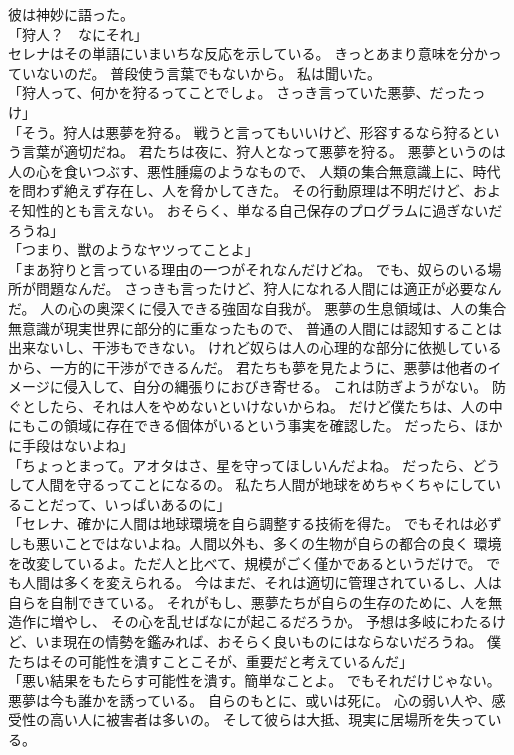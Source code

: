 \documentclass[../IHMain]{subfiles}
\begin{document}
彼は神妙に語った。\\
「狩人？　なにそれ」\\
セレナはその単語にいまいちな反応を示している。
きっとあまり意味を分かっていないのだ。
普段使う言葉でもないから。
私は聞いた。\\
「狩人って、何かを狩るってことでしょ。
さっき言っていた悪夢、だったっけ」\\
「そう。狩人は悪夢を狩る。
戦うと言ってもいいけど、形容するなら狩るという言葉が適切だね。
君たちは夜に、狩人となって悪夢を狩る。
悪夢というのは人の心を食いつぶす、悪性腫瘍のようなもので、
人類の集合無意識上に、時代を問わず絶えず存在し、人を脅かしてきた。
その行動原理は不明だけど、およそ知性的とも言えない。
おそらく、単なる自己保存のプログラムに過ぎないだろうね」\\
「つまり、獣のようなヤツってことよ」\\
「まあ狩りと言っている理由の一つがそれなんだけどね。
でも、奴らのいる場所が問題なんだ。
さっきも言ったけど、狩人になれる人間には適正が必要なんだ。
人の心の奥深くに侵入できる強固な自我が。
悪夢の生息領域は、人の集合無意識が現実世界に部分的に重なったもので、
普通の人間には認知することは出来ないし、干渉もできない。
けれど奴らは人の心理的な部分に依拠しているから、一方的に干渉ができるんだ。
君たちも夢を見たように、悪夢は他者のイメージに侵入して、自分の縄張りにおびき寄せる。
これは防ぎようがない。
防ぐとしたら、それは人をやめないといけないからね。
だけど僕たちは、人の中にもこの領域に存在できる個体がいるという事実を確認した。
だったら、ほかに手段はないよね」\\
「ちょっとまって。アオタはさ、星を守ってほしいんだよね。
だったら、どうして人間を守るってことになるの。
私たち人間が地球をめちゃくちゃにしていることだって、いっぱいあるのに」\\
「セレナ、確かに人間は地球環境を自ら調整する技術を得た。
でもそれは必ずしも悪いことではないよね。人間以外も、多くの生物が自らの都合の良く
環境を改変しているよ。ただ人と比べて、規模がごく僅かであるというだけで。
でも人間は多くを変えられる。
今はまだ、それは適切に管理されているし、人は自らを自制できている。
それがもし、悪夢たちが自らの生存のために、人を無造作に増やし、
その心を乱せばなにが起こるだろうか。
予想は多岐にわたるけど、いま現在の情勢を鑑みれば、おそらく良いものにはならないだろうね。
僕たちはその可能性を潰すことこそが、重要だと考えているんだ」\\
「悪い結果をもたらす可能性を潰す。簡単なことよ。
でもそれだけじゃない。悪夢は今も誰かを誘っている。
自らのもとに、或いは死に。
心の弱い人や、感受性の高い人に被害者は多いの。
そして彼らは大抵、現実に居場所を失っている。
\end{document}
